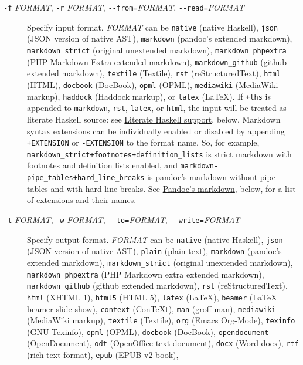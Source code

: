 \documentclass[]{article}
\begin{document}
\begin{description}
\item[\texttt{-f} \emph{FORMAT}, \texttt{-r} \emph{FORMAT},
\texttt{-{}-from=}\emph{FORMAT}, \texttt{-{}-read=}\emph{FORMAT}]
Specify input format. \emph{FORMAT} can be \texttt{native} (native
Haskell), \texttt{json} (JSON version of native AST), \texttt{markdown}
(pandoc's extended markdown), \texttt{markdown\_strict} (original
unextended markdown), \texttt{markdown\_phpextra} (PHP Markdown Extra
extended markdown), \texttt{markdown\_github} (github extended
markdown), \texttt{textile} (Textile), \texttt{rst} (reStructuredText),
\texttt{html} (HTML), \texttt{docbook} (DocBook), \texttt{opml} (OPML),
\texttt{mediawiki} (MediaWiki markup), \texttt{haddock} (Haddock
markup), or \texttt{latex} (LaTeX). If \texttt{+lhs} is appended to
\texttt{markdown}, \texttt{rst}, \texttt{latex}, or \texttt{html}, the
input will be treated as literate Haskell source: see
\hyperref[literate-haskell-support]{Literate Haskell support}, below.
Markdown syntax extensions can be individually enabled or disabled by
appending \texttt{+EXTENSION} or \texttt{-EXTENSION} to the format name.
So, for example, \texttt{markdown\_strict+footnotes+definition\_lists}
is strict markdown with footnotes and definition lists enabled, and
\texttt{markdown-pipe\_tables+hard\_line\_breaks} is pandoc's markdown
without pipe tables and with hard line breaks. See
\hyperref[pandocs-markdown]{Pandoc's markdown}, below, for a list of
extensions and their names.
\item[\texttt{-t} \emph{FORMAT}, \texttt{-w} \emph{FORMAT},
\texttt{-{}-to=}\emph{FORMAT}, \texttt{-{}-write=}\emph{FORMAT}]
Specify output format. \emph{FORMAT} can be \texttt{native} (native
Haskell), \texttt{json} (JSON version of native AST), \texttt{plain}
(plain text), \texttt{markdown} (pandoc's extended markdown),
\texttt{markdown\_strict} (original unextended markdown),
\texttt{markdown\_phpextra} (PHP Markdown extra extended markdown),
\texttt{markdown\_github} (github extended markdown), \texttt{rst}
(reStructuredText), \texttt{html} (XHTML 1), \texttt{html5} (HTML 5),
\texttt{latex} (LaTeX), \texttt{beamer} (LaTeX beamer slide show),
\texttt{context} (ConTeXt), \texttt{man} (groff man), \texttt{mediawiki}
(MediaWiki markup), \texttt{textile} (Textile), \texttt{org} (Emacs
Org-Mode), \texttt{texinfo} (GNU Texinfo), \texttt{opml} (OPML),
\texttt{docbook} (DocBook), \texttt{opendocument} (OpenDocument),
\texttt{odt} (OpenOffice text document), \texttt{docx} (Word docx),
\texttt{rtf} (rich text format), \texttt{epub} (EPUB v2 book),

\end{description}
\end{document}
